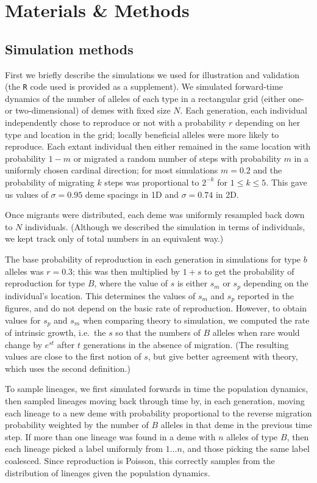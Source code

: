 \documentclass{article}
\newcommand{\linelabel}[1]{}
\newcommand{\revpoint}[2]{}
\begin{document}
\section*{Materials \& Methods}

\subsection{Simulation methods}
\label{ss:simulations}

First we briefly describe the simulations we used for illustration and validation
(the \texttt{R} code used is provided as a supplement).
We simulated forward-time dynamics of the number of alleles of each type in a rectangular grid (either one- or two-dimensional) of demes with fixed size $N$.
Each generation, each individual independently chose to reproduce or not with a probability $r$ depending on her type and location in the grid;
locally beneficial alleles were more likely to reproduce.
Each extant individual then either remained in the same location with probability $1-m$ or
migrated a random number of steps with probability $m$
in a uniformly chosen cardinal direction; 
for most simulations $m=0.2$ and
the probability of migrating $k$ steps was proportional to $2^{-k}$ for $1\le k \le 5$.
This gave us values of $\sigma=0.95$ deme spacings in 1D
and $\sigma=0.74$ in 2D.
\linelabel{rr:sim_details}
Once migrants were distributed, each deme was uniformly resampled back down to $N$ individuals.
(Although we described the simulation in terms of individuals,
we kept track only of total numbers in an equivalent way.)

The base probability of reproduction in each generation in simulations for type $b$ alleles was $r=0.3$;
this was then multiplied by $1+s$ to get the probability of reproduction for type $B$,
where the value of $s$ is either $s_m$ or $s_p$ depending on the individual's location.
This determines the values of $s_m$ and $s_p$ reported in the figures, 
and do not depend on the basic rate of reproduction. \revpoint{2}{5}
However, to obtain values for $s_p$ and $s_m$ when comparing theory to simulation,
we computed the rate of intrinsic growth, 
i.e.\ the $s$ so that the numbers of $B$ alleles when rare would change by $e^{st}$ after $t$ generations
in the absence of migration.
(The resulting values are close to the first notion of $s$,
but give better agreement with theory,
which uses the second definition.)

To sample lineages, we first simulated forwards in time the population dynamics,
then sampled lineages moving back through time
by, in each generation,
moving each lineage to a new deme with probability proportional to the reverse migration probability
weighted by the number of $B$ alleles in that deme in the previous time step.
If more than one lineage was found in a deme with $n$ alleles of type $B$,
then each lineage picked a label uniformly from $1 \ldots n$,
and those picking the same label coalesced.
Since reproduction is Poisson, this correctly samples from the distribution of lineages given the population dynamics.
\end{document}
